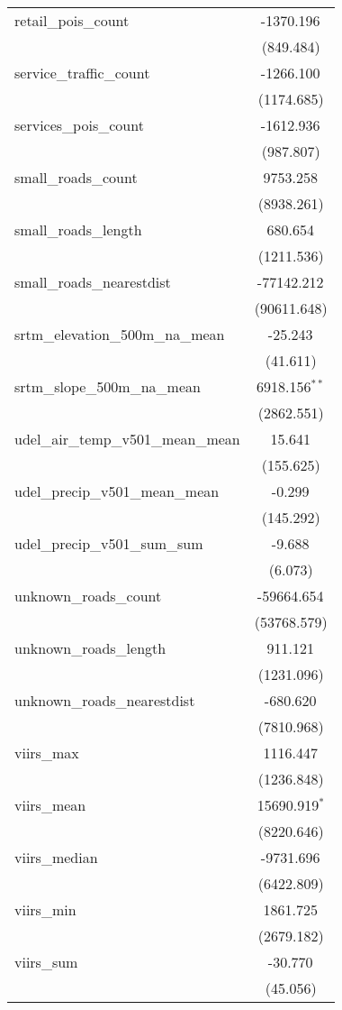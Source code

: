 \begin{table}[!htbp]
\begin{tabular}{@{\extracolsep{5pt}}lc}
 retail_pois_count & -1370.196$^{}$ \\
  & (849.484) \\
 service_traffic_count & -1266.100$^{}$ \\
  & (1174.685) \\
 services_pois_count & -1612.936$^{}$ \\
  & (987.807) \\
 small_roads_count & 9753.258$^{}$ \\
  & (8938.261) \\
 small_roads_length & 680.654$^{}$ \\
  & (1211.536) \\
 small_roads_nearestdist & -77142.212$^{}$ \\
  & (90611.648) \\
 srtm_elevation_500m_na_mean & -25.243$^{}$ \\
  & (41.611) \\
 srtm_slope_500m_na_mean & 6918.156$^{**}$ \\
  & (2862.551) \\
 udel_air_temp_v501_mean_mean & 15.641$^{}$ \\
  & (155.625) \\
 udel_precip_v501_mean_mean & -0.299$^{}$ \\
  & (145.292) \\
 udel_precip_v501_sum_sum & -9.688$^{}$ \\
  & (6.073) \\
 unknown_roads_count & -59664.654$^{}$ \\
  & (53768.579) \\
 unknown_roads_length & 911.121$^{}$ \\
  & (1231.096) \\
 unknown_roads_nearestdist & -680.620$^{}$ \\
  & (7810.968) \\
 viirs_max & 1116.447$^{}$ \\
  & (1236.848) \\
 viirs_mean & 15690.919$^{*}$ \\
  & (8220.646) \\
 viirs_median & -9731.696$^{}$ \\
  & (6422.809) \\
 viirs_min & 1861.725$^{}$ \\
  & (2679.182) \\
 viirs_sum & -30.770$^{}$ \\
  & (45.056) \\

\end{tabular}
\end{table}
